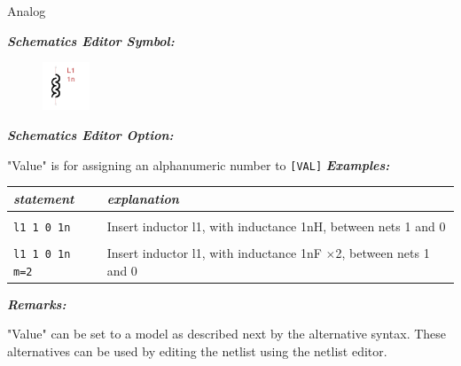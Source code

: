 Analog

\textbf{\textit{Schematics Editor Symbol:}}

\begin{figure}[htb]
  \begin{center}
    \includegraphics[width=0.125\textwidth]{./pics/SpiceEl/Inductor.png}
  \end{center}
\end{figure}

\textbf{\textit{Schematics Editor Option:}}

"\textsf{Value}" is for assigning an alphanumeric number to \texttt{[VAL]}
\newpage
\textbf{\textit{Examples:}}

\begin{longtable}{l l}
\textit{statement} & \textit{explanation} \\ \hline \\ \vspace{-0.8\parskip} 
\begin{minipage}{15em}\texttt{l1 1 0 1n}\end{minipage} & 
\begin{minipage}{15em}{\small Insert inductor l1, with inductance 1nH, between nets 1 and 0}\end{minipage} \\ \\
\begin{minipage}{15em}\texttt{l1 1 0 1n m=2}\end{minipage} & 
\begin{minipage}{15em}{\small Insert inductor l1, with inductance 1nF $\times$2, between nets 1 and 0}\end{minipage}
\end{longtable}

\textbf{\textit{Remarks:}}

"\textsf{Value}" can be set to a model as described next by the alternative syntax. These alternatives can be used by editing the netlist using the netlist editor.



